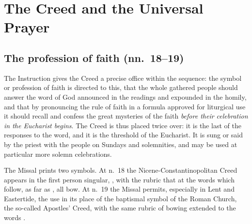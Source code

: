 \section{The Creed and the Universal Prayer}

\subsection{The profession of faith (nn.\ 18--19)}

The Instruction gives the Creed a precise office within the sequence: the symbol or profession
of faith is directed to this, that the whole gathered people should answer the word of God
announced in the readings and expounded in the homily, and that by pronouncing the rule of
faith in a formula approved for liturgical use it should recall and confess the great mysteries
of the faith \emph{before their celebration in the Eucharist begins}. The Creed is thus placed
twice over: it is the last of the responses to the word, and it is the threshold of the
Eucharist. It is sung or said by the priest with the people on Sundays and solemnities, and may
be used at particular more solemn celebrations.

The Missal prints two symbols. At n.\ 18 the Nicene-Constantinopolitan Creed appears in the
first person singular, , with the rubric that at the words which
follow, as far as , all bow. At n.\ 19 the Missal permits, especially
in Lent and Eastertide, the use in its place of the baptismal symbol of the Roman Church, the
so-called Apostles' Creed, with the same rubric of bowing extended to the words .

